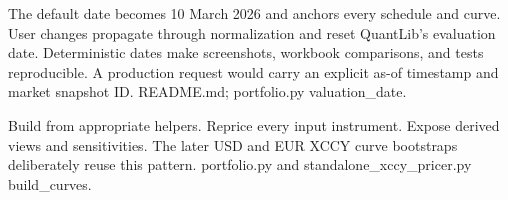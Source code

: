 {The default date becomes 10 March 2026 and anchors every schedule and curve.}
{User changes propagate through normalization and reset QuantLib's evaluation date.}
{Deterministic dates make screenshots, workbook comparisons, and tests reproducible.}
{A production request would carry an explicit as-of timestamp and market snapshot ID.}
{README.md; portfolio.py valuation\_date.}

{Build from appropriate helpers.}
{Reprice every input instrument.}
{Expose derived views and sensitivities.}
{The later USD and EUR XCCY curve bootstraps deliberately reuse this pattern.}
{portfolio.py and standalone\_xccy\_pricer.py build\_curves.}
